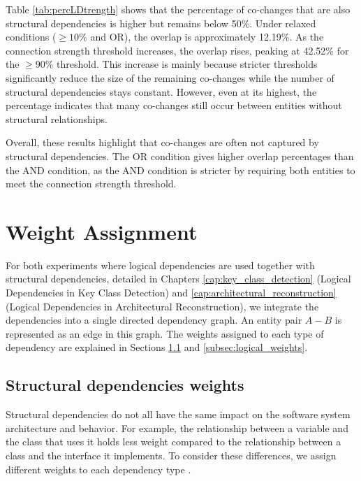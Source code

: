 Table \ref{tab:percLDtrength} shows that the percentage of co-changes that are also structural dependencies is higher but remains below 50\%. Under relaxed conditions (\(\geq 10\%\) and OR), the overlap is approximately 12.19\%. As the connection strength threshold increases, the overlap rises, peaking at 42.52\% for the \(\geq 90\%\) threshold. This increase is mainly because stricter thresholds significantly reduce the size of the remaining co-changes while the number of structural dependencies stays constant. However, even at its highest, the percentage indicates that many co-changes still occur between entities without structural relationships.

Overall, these results highlight that co-changes are often not captured by structural dependencies. The OR condition gives higher overlap percentages than the AND condition, as the AND condition is stricter by requiring both entities to meet the connection strength threshold.



\section{Weight Assignment}
\label{sec:weight_assignment}

\hspace{4em}For both experiments where logical dependencies are used together with structural dependencies, detailed in Chapters \ref{cap:key_class_detection} (Logical Dependencies in Key Class Detection) and \ref{cap:architectural_reconstruction} (Logical Dependencies in Architectural Reconstruction), we integrate the dependencies into a single directed dependency graph. An entity pair \( A - B \) is represented as an edge in this graph. The weights assigned to each type of dependency are explained in Sections \ref{subsec:structural_weights} and \ref{subsec:logical_weights}.

\subsection{Structural dependencies weights}
\label{subsec:structural_weights}

\hspace{4em}Structural dependencies do not all have the same impact on the software system architecture and behavior. For example, the relationship between a variable and the class that uses it holds less weight compared to the relationship between a class and the interface it implements. To consider these differences, we assign different weights to each dependency type \cite{cluster-access}.

